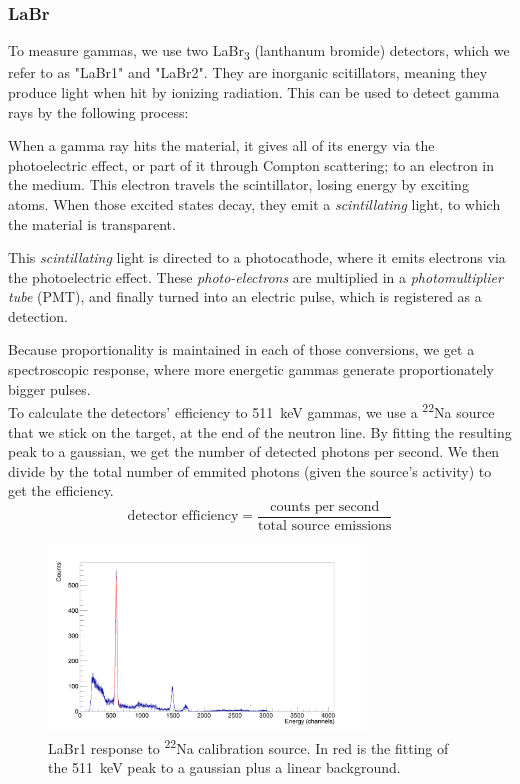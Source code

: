 \documentclass[a4paper,12pt]{report}
\newcommand{\Na}{\textsuperscript{22}Na }
\begin{document}
\subsubsection{LaBr}
To measure gammas, we use two LaBr\textsubscript{3} (lanthanum bromide) detectors, which we refer to as "LaBr1" and "LaBr2".
They are inorganic scitillators, meaning they produce light when hit by ionizing radiation.
This can be used to detect gamma rays by the following process:

When a gamma ray hits the material, it gives all of its energy via the photoelectric effect, or part of it through Compton scattering; to an electron in the medium.
This electron travels the scintillator, losing energy by exciting atoms.
When those excited states decay, they emit a \textit{scintillating} light, to which the material is transparent.

This \textit{scintillating} light is directed to a photocathode, where it emits electrons via the photoelectric effect.
These \textit{photo-electrons} are multiplied in a \textit{photomultiplier tube} (PMT), and finally turned into an electric pulse, which is registered as a detection.

Because proportionality is maintained in each of those conversions, we get a spectroscopic response, where more energetic gammas generate proportionately bigger pulses.
\\

To calculate the detectors' efficiency to \qty{511}{\keV} gammas, we use a \Na source that we stick on the target, at the end of the neutron line.
By fitting the resulting peak to a gaussian, we get the number of detected photons per second.
We then divide by the total number of emmited photons (given the source's activity) to get the efficiency.
\begin{equation}
	\text{detector efficiency} = \frac{\text{counts per second}}{\text{total source emissions}}
\end{equation}

\begin{figure}[H]
	\centering
	\includegraphics[width=0.75\textwidth]{labr_na22_calibration.png}
	\caption{LaBr1 response to \Na calibration source. In red is the fitting of the \qty{511}{\keV} peak to a gaussian plus a linear background.}
	\label{labr_na22_calibration}
\end{figure}
\end{document}
